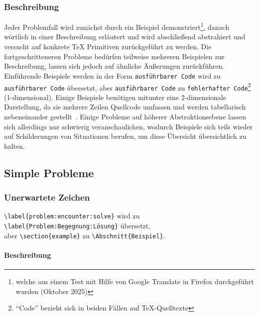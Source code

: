 \subsubsection{Beschreibung}
Jeder Problemfall wird zunächst durch ein Beispiel demonstriert\footnote{welche aus einem Test mit Hilfe von Google Translate in Firefox durchgeführt wurden (Oktober 2025)}, danach wörtlich in einer Beschreibung erläutert und wird abschließend abstrahiert und versucht auf konkrete \TeX{} Primitiven zurückgeführt zu werden. Die fortgeschritteneren Probleme bedürfen teilweise mehreren Beispielen zur Beschreibung, lassen sich jedoch auf ähnliche Äußerungen zurückführen. Einführende Beispiele werden in der Form \texttt{ausführbarer Code} wird zu \texttt{ausführbarer Code} übersetzt, aber \texttt{ausführbarer Code} zu \texttt{fehlerhafter Code}\footnote{\enquote{Code} bezieht sich in beiden Fällen auf \TeX{}-Quelltexte} (1-dimensional). Einige Beispiele benötigen mitunter eine 2-dimensionale Darstellung, da sie mehrere Zeilen Quellcode umfassen und werden tabellarisch nebeneinander gestellt~. Einige Probleme auf höherer Abstraktionsebene lassen sich allerdings nur schwierig veranschaulichen, wodurch Beispiele sich teils wieder auf Schilderungen von Situationen berufen, um diese Übersicht übersichtlich zu halten.%

\subsection{Simple Probleme}\label{problems:simple}
\subsubsection{Unerwartete Zeichen}\label{problems:dim0}
\verb|\label{problem:encounter:solve}| wird zu \verb|\label{Problem:Begegnung:Lösung}| übersetzt,\\aber \verb|\section{example}| zu \verb|\Abschnitt{Beispiel}|.
\paragraph*{Beschreibung}
